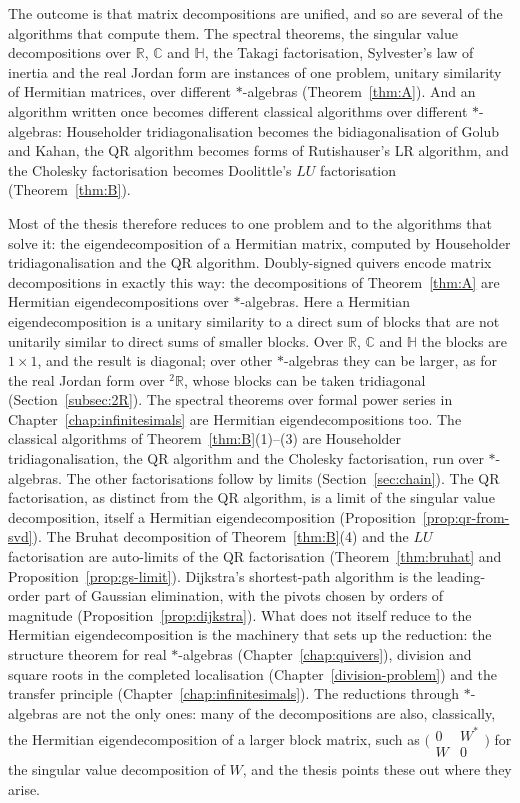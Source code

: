 \documentclass[12pt, a4paper]{report}
\theoremstyle{plain}
\theoremstyle{definition}
\theoremstyle{remark}
\theoremstyle{plain}
\newcommand{\staralgs}[0]{$*$-algebras}
\newcommand{\RR}{\mathbb{R}}
\newcommand{\CC}{\mathbb{C}}
\newcommand{\HH}{\mathbb{H}}
\newcommand{\twoR}{{}^{2}\mathbb{R}}
\begin{document}
The outcome is that matrix decompositions are unified, and so are several of the algorithms that compute them. The spectral theorems, the singular value decompositions over $\RR$, $\CC$ and $\HH$, the Takagi factorisation, Sylvester's law of inertia and the real Jordan form are instances of one problem, unitary similarity of Hermitian matrices, over different \staralgs{} (Theorem~\ref{thm:A}). And an algorithm written once becomes different classical algorithms over different \staralgs{}: Householder tridiagonalisation becomes the bidiagonalisation of Golub and Kahan, the QR algorithm becomes forms of Rutishauser's LR algorithm, and the Cholesky factorisation becomes Doolittle's $LU$ factorisation (Theorem~\ref{thm:B}).

Most of the thesis therefore reduces to one problem and to the algorithms that solve it: the eigendecomposition of a Hermitian matrix, computed by Householder tridiagonalisation and the QR algorithm. Doubly-signed quivers encode matrix decompositions in exactly this way: the decompositions of Theorem~\ref{thm:A} are Hermitian eigendecompositions over $*$-algebras. Here a Hermitian eigendecomposition is a unitary similarity to a direct sum of blocks that are not unitarily similar to direct sums of smaller blocks. Over $\RR$, $\CC$ and $\HH$ the blocks are $1\times1$, and the result is diagonal; over other $*$-algebras they can be larger, as for the real Jordan form over $\twoR$, whose blocks can be taken tridiagonal (Section~\ref{subsec:2R}). The spectral theorems over formal power series in Chapter~\ref{chap:infinitesimals} are Hermitian eigendecompositions too. The classical algorithms of Theorem~\ref{thm:B}(1)--(3) are Householder tridiagonalisation, the QR algorithm and the Cholesky factorisation, run over $*$-algebras. The other factorisations follow by limits (Section~\ref{sec:chain}). The QR factorisation, as distinct from the QR algorithm, is a limit of the singular value decomposition, itself a Hermitian eigendecomposition (Proposition~\ref{prop:qr-from-svd}). The Bruhat decomposition of Theorem~\ref{thm:B}(4) and the $LU$ factorisation are auto-limits of the QR factorisation (Theorem~\ref{thm:bruhat} and Proposition~\ref{prop:gs-limit}). Dijkstra's shortest-path algorithm is the leading-order part of Gaussian elimination, with the pivots chosen by orders of magnitude (Proposition~\ref{prop:dijkstra}). What does not itself reduce to the Hermitian eigendecomposition is the machinery that sets up the reduction: the structure theorem for real $*$-algebras (Chapter~\ref{chap:quivers}), division and square roots in the completed localisation (Chapter~\ref{division-problem}) and the transfer principle (Chapter~\ref{chap:infinitesimals}). The reductions through $*$-algebras are not the only ones: many of the decompositions are also, classically, the Hermitian eigendecomposition of a larger block matrix, such as $\bigl(\begin{smallmatrix}0&W^*\\W&0\end{smallmatrix}\bigr)$ for the singular value decomposition of $W$, and the thesis points these out where they arise.
\end{document}

